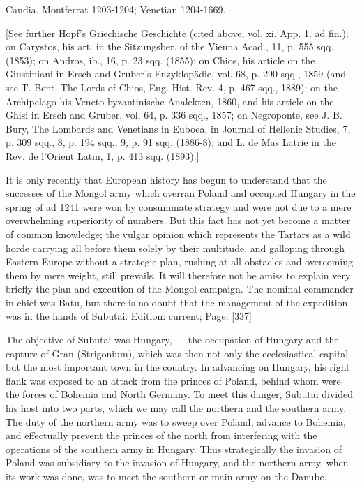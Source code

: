 Candia.
Montferrat 1203-1204; Venetian 1204-1669.

[See further Hopf\texthebrew{}’s Griechische Geschichte (cited above, vol. xi. App. 1. ad fin.); on Carystos, his art. in the Sitzungsber. of the Vienna Acad., 11, p. 555 sqq. (1853); on Andros, ib., 16, p. 23 sqq. (1855); on Chios, his article on the Giustiniani in Ersch and Gruber\texthebrew{}’s Enzyklopädie, vol. 68, p. 290 sqq., 1859 (and see T. Bent, The Lords of Chios, Eng. Hist. Rev. 4, p. 467 sqq., 1889); on the Archipelago his Veneto-byzantinische Analekten, 1860, and his article on the Ghisi in Ersch and Gruber, vol. 64, p. 336 sqq., 1857; on Negroponte, see J. B. Bury, The Lombards and Venetians in Euboea, in Journal of Hellenic Studies, 7, p. 309 sqq., 8, p. 194 sqq., 9, p. 91 sqq. (1886-8); and L. de Mas Latrie in the Rev. de l\texthebrew{}’Orient Latin, 1, p. 413 sqq. (1893).]


It is only recently that European history has begun to understand that the successes of the Mongol army which overran Poland and occupied Hungary in the spring of ad 1241 were won by consummate strategy and were not due to a mere overwhelming superiority of numbers. But this fact has not yet become a matter of common knowledge; the vulgar opinion which represents the Tartars as a wild horde carrying all before them solely by their multitude, and galloping through Eastern Europe without a strategic plan, rushing at all obstacles and overcoming them by mere weight, still prevails. It will therefore not be amiss to explain very briefly the plan and execution of the Mongol campaign. The nominal commander-in-chief was Batu, but there is no doubt that the management of the expedition was in the hands of Subutai.
Edition: current; Page: [337]

The objective of Subutai was Hungary, \texthebrew{—} the occupation of Hungary and the capture of Gran (Strigonium), which was then not only the ecclesiastical capital but the most important town in the country. In advancing on Hungary, his right flank was exposed to an attack from the princes of Poland, behind whom were the forces of Bohemia and North Germany. To meet this danger, Subutai divided his host into two parts, which we may call the northern and the southern army. The duty of the northern army was to sweep over Poland, advance to Bohemia, and effectually prevent the princes of the north from interfering with the operations of the southern army in Hungary. Thus strategically the invasion of Poland was subsidiary to the invasion of Hungary, and the northern army, when its work was done, was to meet the southern or main army on the Danube.


